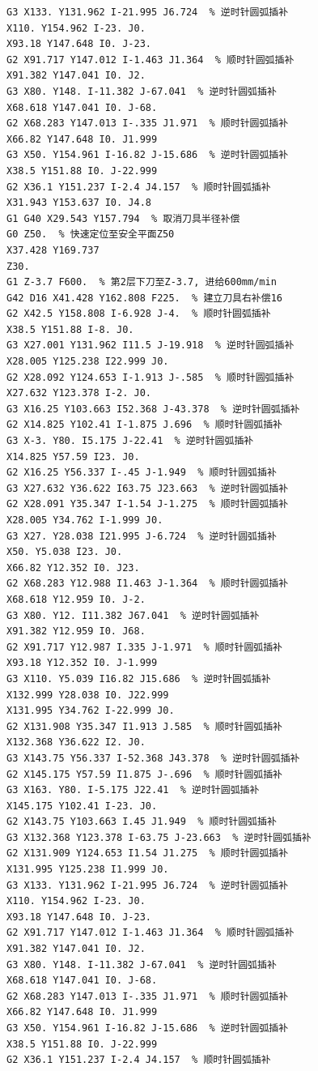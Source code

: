 \documentclass{xautCADreport}
\begin{document}
\begin{lstlisting}[language={}, title={工序50-凸模.nc（完整程序）}, basicstyle=\ttfamily\tiny]
G3 X133. Y131.962 I-21.995 J6.724  % 逆时针圆弧插补
X110. Y154.962 I-23. J0.
X93.18 Y147.648 I0. J-23.
G2 X91.717 Y147.012 I-1.463 J1.364  % 顺时针圆弧插补
X91.382 Y147.041 I0. J2.
G3 X80. Y148. I-11.382 J-67.041  % 逆时针圆弧插补
X68.618 Y147.041 I0. J-68.
G2 X68.283 Y147.013 I-.335 J1.971  % 顺时针圆弧插补
X66.82 Y147.648 I0. J1.999
G3 X50. Y154.961 I-16.82 J-15.686  % 逆时针圆弧插补
X38.5 Y151.88 I0. J-22.999
G2 X36.1 Y151.237 I-2.4 J4.157  % 顺时针圆弧插补
X31.943 Y153.637 I0. J4.8
G1 G40 X29.543 Y157.794  % 取消刀具半径补偿
G0 Z50.  % 快速定位至安全平面Z50
X37.428 Y169.737
Z30.
G1 Z-3.7 F600.  % 第2层下刀至Z-3.7, 进给600mm/min
G42 D16 X41.428 Y162.808 F225.  % 建立刀具右补偿16
G2 X42.5 Y158.808 I-6.928 J-4.  % 顺时针圆弧插补
X38.5 Y151.88 I-8. J0.
G3 X27.001 Y131.962 I11.5 J-19.918  % 逆时针圆弧插补
X28.005 Y125.238 I22.999 J0.
G2 X28.092 Y124.653 I-1.913 J-.585  % 顺时针圆弧插补
X27.632 Y123.378 I-2. J0.
G3 X16.25 Y103.663 I52.368 J-43.378  % 逆时针圆弧插补
G2 X14.825 Y102.41 I-1.875 J.696  % 顺时针圆弧插补
G3 X-3. Y80. I5.175 J-22.41  % 逆时针圆弧插补
X14.825 Y57.59 I23. J0.
G2 X16.25 Y56.337 I-.45 J-1.949  % 顺时针圆弧插补
G3 X27.632 Y36.622 I63.75 J23.663  % 逆时针圆弧插补
G2 X28.091 Y35.347 I-1.54 J-1.275  % 顺时针圆弧插补
X28.005 Y34.762 I-1.999 J0.
G3 X27. Y28.038 I21.995 J-6.724  % 逆时针圆弧插补
X50. Y5.038 I23. J0.
X66.82 Y12.352 I0. J23.
G2 X68.283 Y12.988 I1.463 J-1.364  % 顺时针圆弧插补
X68.618 Y12.959 I0. J-2.
G3 X80. Y12. I11.382 J67.041  % 逆时针圆弧插补
X91.382 Y12.959 I0. J68.
G2 X91.717 Y12.987 I.335 J-1.971  % 顺时针圆弧插补
X93.18 Y12.352 I0. J-1.999
G3 X110. Y5.039 I16.82 J15.686  % 逆时针圆弧插补
X132.999 Y28.038 I0. J22.999
X131.995 Y34.762 I-22.999 J0.
G2 X131.908 Y35.347 I1.913 J.585  % 顺时针圆弧插补
X132.368 Y36.622 I2. J0.
G3 X143.75 Y56.337 I-52.368 J43.378  % 逆时针圆弧插补
G2 X145.175 Y57.59 I1.875 J-.696  % 顺时针圆弧插补
G3 X163. Y80. I-5.175 J22.41  % 逆时针圆弧插补
X145.175 Y102.41 I-23. J0.
G2 X143.75 Y103.663 I.45 J1.949  % 顺时针圆弧插补
G3 X132.368 Y123.378 I-63.75 J-23.663  % 逆时针圆弧插补
G2 X131.909 Y124.653 I1.54 J1.275  % 顺时针圆弧插补
X131.995 Y125.238 I1.999 J0.
G3 X133. Y131.962 I-21.995 J6.724  % 逆时针圆弧插补
X110. Y154.962 I-23. J0.
X93.18 Y147.648 I0. J-23.
G2 X91.717 Y147.012 I-1.463 J1.364  % 顺时针圆弧插补
X91.382 Y147.041 I0. J2.
G3 X80. Y148. I-11.382 J-67.041  % 逆时针圆弧插补
X68.618 Y147.041 I0. J-68.
G2 X68.283 Y147.013 I-.335 J1.971  % 顺时针圆弧插补
X66.82 Y147.648 I0. J1.999
G3 X50. Y154.961 I-16.82 J-15.686  % 逆时针圆弧插补
X38.5 Y151.88 I0. J-22.999
G2 X36.1 Y151.237 I-2.4 J4.157  % 顺时针圆弧插补

\end{lstlisting}
\end{document}
